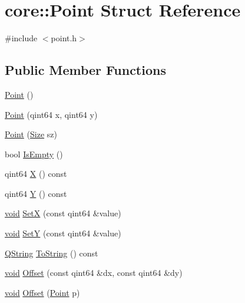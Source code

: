 \hypertarget{structcore_1_1_point}{\section{core\-:\-:\-Point \-Struct \-Reference}
\label{structcore_1_1_point}
}


{\ttfamily \#include $<$point.\-h$>$}

\subsection*{\-Public \-Member \-Functions}
\begin{DoxyCompactItemize}
\item 
\hyperlink{group___o_p_map_widget_ga674c2f3c2d11aa89d2c51dc42bdeb88e}{\-Point} ()
\item 
\hyperlink{group___o_p_map_widget_gad1dcff6c9f2c25281ea28be5eb36e2b1}{\-Point} (qint64 x, qint64 y)
\item 
\hyperlink{group___o_p_map_widget_gad3510c0e0b0ac201ddaced67030e7cdc}{\-Point} (\hyperlink{structcore_1_1_size}{\-Size} sz)
\item 
bool \hyperlink{group___o_p_map_widget_ga82d2ada8c2a4cff27b8d1cd67e5b8677}{\-Is\-Empty} ()
\item 
qint64 \hyperlink{group___o_p_map_widget_gaa80c6ca1d28f90037f40c53e2093cde2}{\-X} () const 
\item 
qint64 \hyperlink{group___o_p_map_widget_ga15325baf78dea74cc34b00887dd5539b}{\-Y} () const 
\item 
\hyperlink{group___u_a_v_objects_plugin_ga444cf2ff3f0ecbe028adce838d373f5c}{void} \hyperlink{group___o_p_map_widget_ga3dea470d6276c4049e2aa39b14d637e7}{\-Set\-X} (const qint64 \&value)
\item 
\hyperlink{group___u_a_v_objects_plugin_ga444cf2ff3f0ecbe028adce838d373f5c}{void} \hyperlink{group___o_p_map_widget_gae987195d2da22e1c8e4ca161fe9a2269}{\-Set\-Y} (const qint64 \&value)
\item 
\hyperlink{group___u_a_v_objects_plugin_gab9d252f49c333c94a72f97ce3105a32d}{\-Q\-String} \hyperlink{group___o_p_map_widget_gabfd5368c170cc03b85baf6c32c56f11a}{\-To\-String} () const 
\item 
\hyperlink{group___u_a_v_objects_plugin_ga444cf2ff3f0ecbe028adce838d373f5c}{void} \hyperlink{group___o_p_map_widget_ga6ffa19db824186dac9bac22ebf314e3e}{\-Offset} (const qint64 \&dx, const qint64 \&dy)
\item 
\hyperlink{group___u_a_v_objects_plugin_ga444cf2ff3f0ecbe028adce838d373f5c}{void} \hyperlink{group___o_p_map_widget_ga31f14855ca1e292676db909b2b0f1c11}{\-Offset} (\hyperlink{structcore_1_1_point}{\-Point} p)
\end{DoxyCompactItemize}
